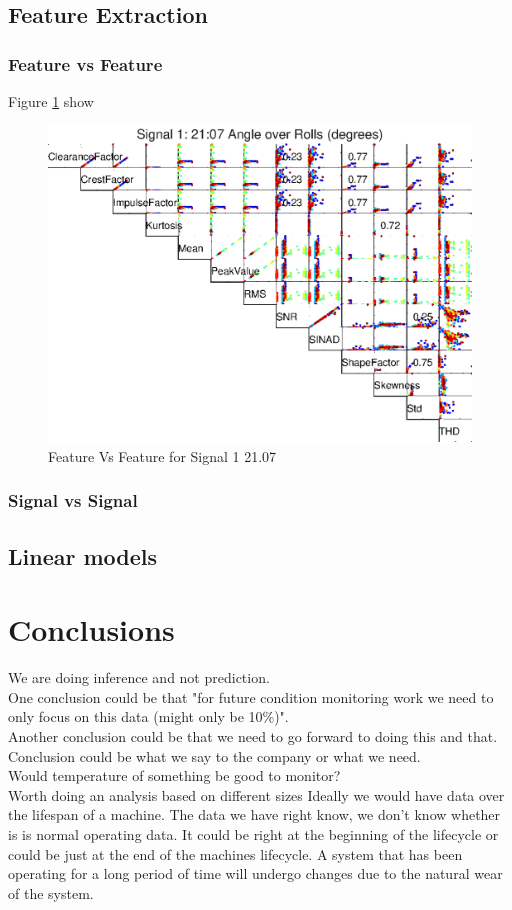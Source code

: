 \documentclass{article}
\begin{document}
\subsection{Feature Extraction}
\subsubsection{Feature vs Feature}
Figure \ref{fig:FeatureVsFeatureSignal1} show 
\begin{figure}[H]
    \centering
    \includegraphics[width=\textwidth, height=\textheight, keepaspectratio]{figures/FeatureVsFeatureSignal1.eps}
    \caption{Feature Vs Feature for Signal 1 21.07}
    \label{fig:FeatureVsFeatureSignal1}
\end{figure}
\subsubsection{Signal vs Signal}
\subsection{Linear models}

\clearpage 
\section{Conclusions}
We are doing inference and not prediction.\\
One conclusion could be that "for future condition monitoring work we need to only focus on this data (might only be 10\%)".\\
Another conclusion could be that we need to go forward to doing this and that.\\
Conclusion could be what we say to the company or what we need.\\
Would temperature of something be good to monitor?\\
Worth doing an analysis based on different sizes
Ideally we would have data over the lifespan of a machine. The data we have right know, we don't know whether is is normal operating data. It could be right at the beginning of the lifecycle or could be just at the end of the machines lifecycle. A system that has been operating for a long period of time will undergo changes due
to the natural wear of the system.
\newpage
\end{document}

